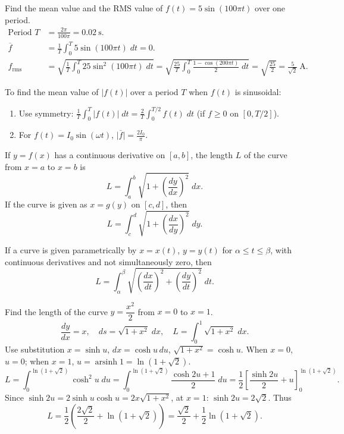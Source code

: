 \documentclass[11pt]{article}
\newcounter{popsec}
\newcounter{popsub}
\newcommand{\courssub}[1]{%
  \stepcounter{popsub}%
  \par\vspace{9pt}\noindent{\popxbold\fontsize{11.5}{13}\selectfont\color{popink}{\color{poporange}\thepopsec.\thepopsub}\hspace{6pt}#1}\par\nopagebreak\vspace{4pt}
}
\begin{document}
\begin{exemplebox}
Find the mean value and the RMS value of $f(t)=5\sin(100\pi t)$ over one period.
\begin{align*}
\text{Period } T &= \frac{2\pi}{100\pi} = 0.02\ \mathrm{s}. \\
\overline{f} &= \frac{1}{T}\int_{0}^{T} 5\sin(100\pi t)\;dt = 0. \\
f_{\mathrm{rms}} &= \sqrt{\frac{1}{T}\int_{0}^{T} 25\sin^{2}(100\pi t)\;dt}
= \sqrt{\frac{25}{T}\int_{0}^{T} \frac{1-\cos(200\pi t)}{2}\;dt}
= \sqrt{\frac{25}{2}} = \frac{5}{\sqrt{2}}\ \mathrm{A}.
\end{align*}
\end{exemplebox}

\begin{methode}
To find the mean value of $|f(t)|$ over a period $T$ when $f(t)$ is sinusoidal:
\begin{enumerate}
\item Use symmetry: $\displaystyle \frac{1}{T}\int_{0}^{T}|f(t)|\;dt = \frac{2}{T}\int_{0}^{T/2}f(t)\;dt$ (if $f\ge 0$ on $[0,T/2]$).
\item For $f(t)=I_{0}\sin(\omega t)$, $\displaystyle \overline{|f|} = \frac{2I_{0}}{\pi}$.
\end{enumerate}
\end{methode}

\courssub{Arc Length of a Curve}

\begin{propriete}
If $y=f(x)$ has a continuous derivative on $[a,b]$, the length $L$ of the curve from $x=a$ to $x=b$ is
\[
L = \int_{a}^{b} \sqrt{1+\left(\frac{dy}{dx}\right)^{2}}\;dx.
\]
If the curve is given as $x=g(y)$ on $[c,d]$, then
\[
L = \int_{c}^{d} \sqrt{1+\left(\frac{dx}{dy}\right)^{2}}\;dy.
\]
\end{propriete}

\begin{propriete}
If a curve is given parametrically by $x=x(t)$, $y=y(t)$ for $\alpha\le t\le \beta$, with continuous derivatives and not simultaneously zero, then
\[
L = \int_{\alpha}^{\beta} \sqrt{\left(\frac{dx}{dt}\right)^{2}+\left(\frac{dy}{dt}\right)^{2}}\;dt.
\]
\end{propriete}

\begin{exemplebox}
Find the length of the curve $y=\dfrac{x^{2}}{2}$ from $x=0$ to $x=1$.
\[
\frac{dy}{dx}=x,\quad ds=\sqrt{1+x^{2}}\;dx,\quad L=\int_{0}^{1}\sqrt{1+x^{2}}\;dx.
\]
Use substitution $x=\sinh u$, $dx=\cosh u\,du$, $\sqrt{1+x^{2}}=\cosh u$. When $x=0$, $u=0$; when $x=1$, $u=\operatorname{arsinh}1=\ln(1+\sqrt{2})$.
\[
L = \int_{0}^{\ln(1+\sqrt{2})}\cosh^{2}u\;du = \int_{0}^{\ln(1+\sqrt{2})}\frac{\cosh 2u+1}{2}\;du
= \frac{1}{2}\left[\frac{\sinh 2u}{2}+u\right]_{0}^{\ln(1+\sqrt{2})}.
\]
Since $\sinh 2u = 2\sinh u\cosh u = 2x\sqrt{1+x^{2}}$, at $x=1$: $\sinh 2u = 2\sqrt{2}$. Thus
\[
L = \frac{1}{2}\left(\frac{2\sqrt{2}}{2}+\ln(1+\sqrt{2})\right) = \frac{\sqrt{2}}{2}+\frac{1}{2}\ln(1+\sqrt{2}).
\]
\end{exemplebox}
\end{document}
